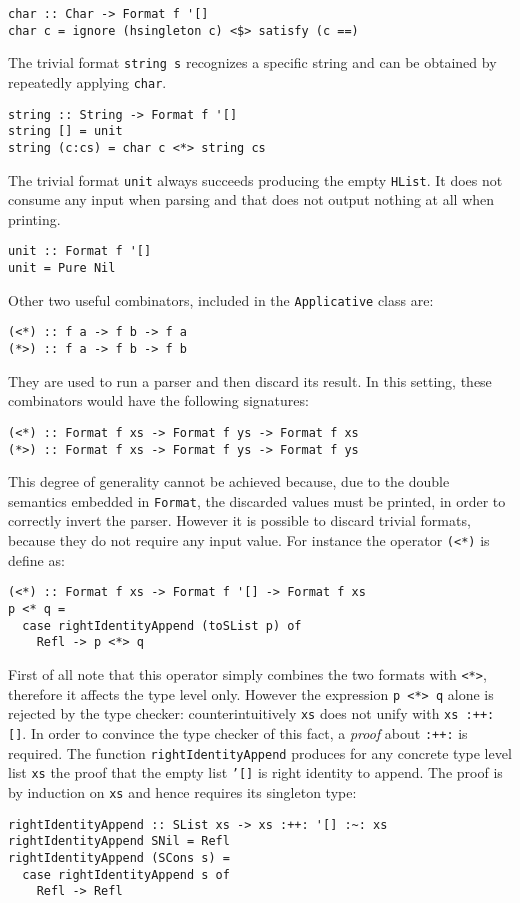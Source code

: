 \documentclass[../Thesis.tex]{subfiles}
\begin{document}
\begin{verbatim}
char :: Char -> Format f '[]
char c = ignore (hsingleton c) <$> satisfy (c ==)
\end{verbatim}

The trivial format \texttt{string s} recognizes a specific string and can be obtained by repeatedly applying \texttt{char}.

\begin{verbatim}
string :: String -> Format f '[]
string [] = unit
string (c:cs) = char c <*> string cs
\end{verbatim}

The trivial format \texttt{unit} always succeeds producing
the empty \texttt{HList}. It does not consume any input when parsing and that does not output nothing at all when printing.
\begin{verbatim}
unit :: Format f '[]
unit = Pure Nil
\end{verbatim}

Other two useful combinators, included in the \texttt{Applicative} class are:
\begin{verbatim}
(<*) :: f a -> f b -> f a
(*>) :: f a -> f b -> f b
\end{verbatim}
They are used to run a parser and then discard its result.
In this setting, these combinators would have the following signatures:
\begin{verbatim}
(<*) :: Format f xs -> Format f ys -> Format f xs
(*>) :: Format f xs -> Format f ys -> Format f ys
\end{verbatim}
This degree of generality cannot be achieved because, due to the double  semantics embedded in \texttt{Format}, the discarded values must be printed, in order to correctly invert the parser.
However it is possible to discard trivial formats, because they do not require any input value.
For instance the operator \texttt{(<*)} is define as:
\begin{verbatim}
(<*) :: Format f xs -> Format f '[] -> Format f xs
p <* q = 
  case rightIdentityAppend (toSList p) of
    Refl -> p <*> q
\end{verbatim}
First of all note that this operator simply combines the two formats with \texttt{<*>}, therefore it affects the type level only.
However the expression \texttt{p <*> q} alone is rejected by the 
type checker: counterintuitively \texttt{xs} does not unify with \texttt{xs :++: []}.
In order to convince the type checker of this fact, a \emph{proof} about \texttt{:++:} is required.
The function \texttt{rightIdentityAppend} produces for any concrete type level list \texttt{xs} the proof that the empty list \texttt{'[]} is right identity to append.
The proof is by induction on \texttt{xs} and hence requires its singleton type:
\begin{verbatim}
rightIdentityAppend :: SList xs -> xs :++: '[] :~: xs
rightIdentityAppend SNil = Refl
rightIdentityAppend (SCons s) = 
  case rightIdentityAppend s of
    Refl -> Refl
\end{verbatim}
\end{document}
